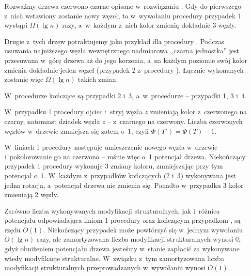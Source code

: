 
\subproblem %
Rozważmy drzewa czerwono-czarne opisane w~rozwiązaniu .
Gdy do pierwszego z~nich wstawiony zostanie nowy węzeł, to w~wywołaniu procedury  przypadek 1 wystąpi $\Omega(\lg n)$ razy, a~w~każdym z~nich kolor zmienią dokładnie 3 węzły.

Drugie z~tych drzew potraktujemy jako przykład dla procedury .
Podczas usuwania najniższego węzła wewnętrznego nadmiarowa ,,czarna jednostka'' jest przesuwana w~górę drzewa aż do jego korzenia, a~na każdym poziomie swój kolor zmienia dokładnie jeden węzeł (przypadek 2 z~procedury ).
Łącznie wykonanych zostanie więc $\Omega(\lg n)$ takich zmian.

\subproblem %
W~procedurze  kończące są przypadki 2 i~3, a~w~procedurze  -- przypadki 1, 3 i~4.

\subproblem %
W~przypadku 1 procedury  ojciec i~stryj węzła $z$ zmieniają kolor z~czerwonego na czarny, natomiast dziadek węzła $z$ -- z~czarnego na czerwony.
Liczba czerwonych węzłów w~drzewie zmniejsza się zatem o~1, czyli $\Phi(T')=\Phi(T)-1$.

\subproblem %
W~liniach 1 procedury  następuje umieszczenie nowego węzła w~drzewie i~pokolorowanie go na czerwono -- rośnie więc o~1 potencjał drzewa.
Niekończący przypadek 1 procedury  wykonuje 3 zmiany koloru, zmniejszając przy tym potencjał o~1.
W~każdym z~przypadków kończących (2 i~3) wykonywana jest jedna rotacja, a~potencjał drzewa nie zmienia się.
Ponadto w~przypadku 3 kolor zmieniają 2 węzły.

\subproblem %
Zarówno liczba wykonywanych modyfikacji strukturalnych, jak i~różnica potencjału odpowiadająca liniom 1 procedury  oraz kończącym przypadkom , są rzędu $O(1)$.
Niekończący przypadek  może powtórzyć się w~jednym wywołaniu $O(\lg n)$ razy, ale zamortyzowana liczba modyfikacji strukturalnych wynosi 0, gdyż obniżeniem potencjału drzewa jesteśmy w~stanie zapłacić za wykonywane wtedy modyfikacje strukturalne.
W~związku z~tym zamortyzowana liczba modyfikacji strukturalnych przeprowadzanych w~wywołaniu  wynosi $O(1)$.

